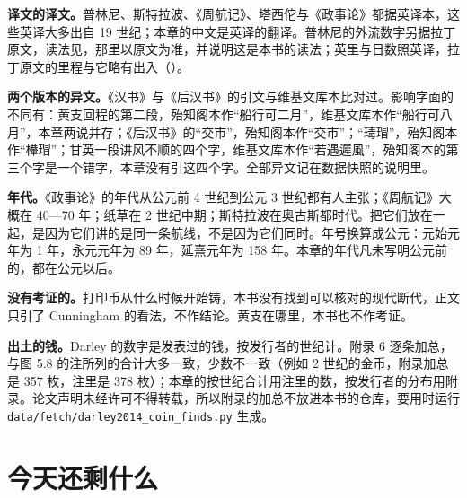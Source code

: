 \begin{deeper}[读这些史料时要注意什么]
\textbf{译文的译文。}普林尼、斯特拉波、《周航记》、塔西佗与《政事论》都据英译本，这些英译大多出自 19 世纪；本章的中文是英译的翻译。普林尼的外流数字另据拉丁原文，读法见，那里以原文为准，并说明这是本书的读法；英里与日数照英译，拉丁原文的里程与它略有出入（）。

\textbf{两个版本的异文。}《汉书》与《后汉书》的引文与维基文库本比对过。影响字面的不同有：黄支回程的第二段，殆知阁本作“船行可二月”，维基文库本作“船行可八月”，本章两说并存；《后汉书》的“交市”，殆知阁本作“交巿”；“瑇瑁”，殆知阁本作“檋瑁”；甘英一段讲风不顺的四个字，维基文库本作“若遇遲風”，殆知阁本的第三个字是一个错字，本章没有引这四个字。全部异文记在数据快照的说明里。

\textbf{年代。}《政事论》的年代从公元前 4 世纪到公元 3 世纪都有人主张；《周航记》大概在 40—70 年；纸草在 2 世纪中期；斯特拉波在奥古斯都时代。把它们放在一起，是因为它们讲的是同一条航线，不是因为它们同时。年号换算成公元：元始元年为 1 年，永元元年为 89 年，延熹元年为 158 年。本章的年代凡未写明公元前的，都在公元以后。

\textbf{没有考证的。}打印币从什么时候开始铸，本书没有找到可以核对的现代断代，正文只引了 Cunningham 的看法，不作结论。黄支在哪里，本书也不作考证。

\textbf{出土的钱。}Darley 的数字是发表过的钱，按发行者的世纪计。附录 6 逐条加总，与图 5.8 的注所列的合计大多一致，少数不一致（例如 2 世纪的金币，附录加总是 357 枚，注里是 378 枚）；本章的按世纪合计用注里的数，按发行者的分布用附录。论文声明未经许可不得转载，所以附录的加总不放进本书的仓库，要用时运行 \texttt{data/fetch/darley2014\_coin\_finds.py} 生成。
\end{deeper}

\section{今天还剩什么}\label{sec:india-legacy}

